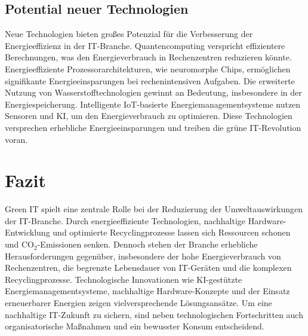 \documentclass[12pt]{article}
\begin{document}
\subsection{Potential neuer Technologien}
Neue Technologien bieten großes Potenzial für die Verbesserung der Energieeffizienz in der IT-Branche. Quantencomputing verspricht effizientere Berechnungen, was den Energieverbrauch in Rechenzentren reduzieren könnte\cite{soare2024}. Energieeffiziente Prozessorarchitekturen, wie neuromorphe Chips, ermöglichen signifikante Energieeinsparungen bei rechenintensiven Aufgaben\cite{nyabuto2024}.
Die erweiterte Nutzung von Wasserstofftechnologien gewinnt an Bedeutung, insbesondere in der Energiespeicherung\cite{judijanto2024}. Intelligente IoT-basierte Energiemanagementsysteme nutzen Sensoren und KI, um den Energieverbrauch zu optimieren\cite{soare2024}. Diese Technologien versprechen erhebliche Energieeinsparungen und treiben die grüne IT-Revolution voran.

\section{Fazit}
Green IT spielt eine zentrale Rolle bei der Reduzierung der Umweltauswirkungen der IT-Branche. Durch energieeffiziente Technologien, nachhaltige Hardware-Entwicklung und optimierte Recyclingprozesse lassen sich Ressourcen schonen und CO$_2$-Emissionen senken. Dennoch stehen der Branche erhebliche Herausforderungen gegenüber, insbesondere der hohe Energieverbrauch von Rechenzentren, die begrenzte Lebensdauer von IT-Geräten und die komplexen Recyclingprozesse. Technologische Innovationen wie KI-gestützte Energiemanagementsysteme, nachhaltige Hardware-Konzepte und der Einsatz erneuerbarer Energien zeigen vielversprechende Lösungsansätze. Um eine nachhaltige IT-Zukunft zu sichern, sind neben technologischen Fortschritten auch organisatorische Maßnahmen und ein bewusster Konsum entscheidend.

\newpage
\end{document}
